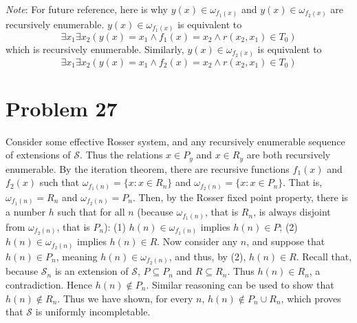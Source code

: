 \documentclass{article}
\theoremstyle{definition}
\begin{document}
\textit{Note}: For future reference, here is why $y(x)\in\omega_{f_1(x)}$ and $y(x)\in\omega_{f_2(x)}$ are recursively enumerable. $y(x)\in\omega_{f_1(x)}$ is equivalent to 
\[ \exists x_1\exists x_2(y(x)=x_1\wedge f_1(x)=x_2\wedge r(x_2,x_1)\in T_0) \] which is recursively enumerable. Similarly, $y(x)\in\omega_{f_2(x)}$ is equivalent to
\[ \exists x_1\exists x_2(y(x)=x_1\wedge f_2(x)=x_2\wedge r(x_2,x_1)\in T_0) \]

\section*{Problem 27}
Consider some effective Rosser system, and any recursively enumerable sequence of extensions of $\mathcal{S}$. Thus the relations $x\in P_y$ and $x\in R_y$ are both recursively enumerable. By the iteration theorem, 
there are recursive functions $f_1(x)$ and $f_2(x)$ such that $\omega_{f_1(n)}=\{x: x\in R_n\}$ and $\omega_{f_2(n)}=\{x: x\in P_n\}$. That is, $\omega_{f_1(n)}=R_n$ and $\omega_{f_2(n)}=P_n$. 
Then, by the Rosser fixed point property, there is a number $h$ such that for all $n$ (because $\omega_{f_1(n)}$, that is $R_n$, is always disjoint from $\omega_{f_2(n)}$, that is $P_n$):\newline
(1) $h(n)\in\omega_{f_1(n)}$ implies $h(n)\in P$;\newline
(2) $h(n)\in\omega_{f_2(n)}$ implies $h(n)\in R$.\newline 
Now consider any $n$, and suppose that $h(n)\in P_n$, meaning $h(n)\in\omega_{f_2(n)}$, and thus, by (2), $h(n)\in R$. 
Recall that, because $\mathcal{S}_n$ is an extension of $\mathcal{S}$, $P\subseteq P_n$ and $R\subseteq R_n$. Thus $h(n)\in R_n$, a contradiction. Hence $h(n)\notin P_n$. Similar reasoning can be used to show that 
$h(n)\notin R_n$. Thus we have shown, for every $n$, $h(n)\notin P_n\cup R_n$, which proves that $\mathcal{S}$ is uniformly incompletable. 
\end{document}
